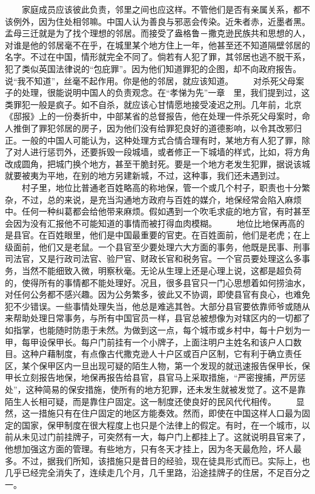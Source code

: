 \documentclass[12pt,oneside]{book}
\begin{document}
\begin{common-format}
　　家庭成员应该彼此负责，邻里之间也应这样。不管他们是否有亲属关系，都不该例外，因为住处相邻嘛。中国人认为善良与邪恶会传染。近朱者赤，近墨者黑。孟母三迁就是为了找个理想的邻居。而接受了盎格鲁－撒克逊民族共和思想的人，对谁是他的邻居毫不在乎，在城里某个地方住上一年，他甚至还不知道隔壁邻居的名字。不过在中国，情形就完全不同了。倘若有人犯了罪，其邻居也逃不脱干系，犯了类似英国法律说的“包庇罪”。因为他们知道罪犯的企图，却不向政府报告。说“我不知道”，丝毫不起作用。你是他的邻居，就应该知道。 
　　对杀死父母案子的处理，很能说明中国人的负责观念。在“孝悌为先”一章　里，我们提到过，这类罪犯一般是疯子。如不自杀，就应该心甘情愿地接受凌迟之刑。几年前，北京《邸报》上的一份奏折中，中部某省的总督报告，他在处理一件杀死父母案时，命人推倒了罪犯邻居的房子，因为他们没有给罪犯良好的道德影响，以令其改邪归正。一般的中国人可能认为，这种处理方式合情合理有时，某地方有人犯了罪，除了对人进行惩罚外，还要拆毁一段城墙，或者修正一下城墙的样式，比如，将方角改成圆角，把城门换个地方，甚至干脆封死。要是一个地方老发生犯罪，据说该城就要被夷为平地，在别的地方另建新城，不过，这种事，我们还未遇到过。 
　　村子里，地位比普通老百姓略高的称地保，管一个或几个村子，职责也十分繁杂，不过，总的来说，是充当沟通地方政府与百姓的媒介，地保经常会陷入麻烦中。任何一种纠葛都会给他带来麻烦。假如遇到一个吹毛求疵的地方官，有时甚至会因为没有汇报他不可能知道的事情而被打得血肉模糊。 
　　地位比地保再高的是县官。在百姓眼里，他们是中国最重要的官吏。在百姓面前，他们是老虎；在上级面前，他们又是老鼠。一个县官至少要处理六大方面的事务，他既是民事、刑事司法官，又是行政司法官、验尸官、财政长官和税务官。一个官员要处理这么多事务，当然不能细致入微，明察秋毫。无论从生理上还是心理上说，这都是超负荷的，使得所有的事情都不能处理好。况且，很多县官只一门心思想着如何捞油水，对任何公务都不感兴趣。因为公务繁多，彼此又不协调，即使县官有良心，也难免犯不少错误。一些事情处理失当，他总是难逃其咎。大部分县官要依靠师爷或随从来帮助处理日常事务，与所有中国官员一样，县官总被想像为对辖区内的一切都了如指掌，也能随时防患于未然。为做到这一点，每个城市或乡村中，每十户划为一甲，每甲设保甲长。每户门前挂有一个小牌子，上面注明户主姓名和该户人口数目。这种户藉制度，有点像古代撒克逊人十户区或百户区制，它有利于确立责任区，某个保甲区内一旦出现可疑的陌生人物，第一个发现的就迅速报告保甲长，保甲长立刻报告地保，地保再报告给县官，县官马上采取措施，“严密搜捕，严厉惩处”，这种简易的保安措施，使所有的地方犯罪，还未发生就被发觉了。这不是靠陌生人长相可疑，而是靠住户固定。这一制度还使良好的民风代代相传。 
　　显然，这一措施只有在住户固定的地区方能奏效。然而，即使在中国这样人口最为固定的国家，保甲制度在很大程度上也只是个法律上的假定。有时，在一个城市，以前从未见过门前挂牌子，可突然有一大，每户门上都挂上了。这就说明县官来了，他想加强这方面的管理。有些地方，只有冬天才挂上，因为冬天最危险，坏人最多。不过，据我们所知，该措施只是昔日的经验，现在徒具形式而已。实际上，也几乎已经完全消失了，连续走几个月，几千里路，沿途挂牌子的住居，不足百分之一。 

\end{common-format}
\end{document}
